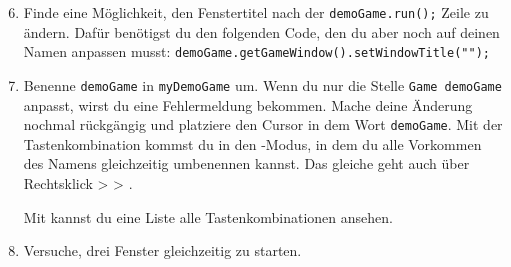 \begin{enumerate} \setcounter{enumi}{5}
\item \optional Finde eine Möglichkeit, den Fenstertitel nach der \lstinline{demoGame.run();} Zeile zu ändern.
Dafür benötigst du den folgenden Code, den du aber noch auf deinen Namen anpassen musst: \lstinline{demoGame.getGameWindow().setWindowTitle("");}
\item \optional Benenne \lstinline{demoGame} in \lstinline{myDemoGame} um.
Wenn du nur die Stelle \lstinline{Game demoGame} anpasst, wirst du eine Fehlermeldung bekommen.
Mache deine Änderung nochmal rückgängig und platziere den Cursor in dem Wort \lstinline{demoGame}.
Mit der Tastenkombination  kommst du in den -Modus, in dem du alle Vorkommen des Namens gleichzeitig umbenennen kannst.
Das gleiche geht auch über Rechtsklick >  > .

Mit  kannst du eine Liste alle Tastenkombinationen ansehen.
\item \optional Versuche, drei Fenster gleichzeitig zu starten.
\end{enumerate}
